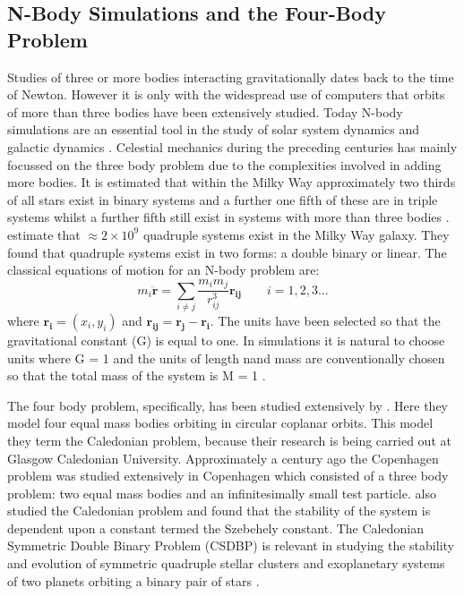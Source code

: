 \documentclass[a4paper,12pt]{article}
\begin{document}
\subsection{N-Body Simulations and the Four-Body Problem}
Studies of three or more bodies interacting gravitationally dates back to the time of Newton. However it is only with the widespread use of computers that orbits of more than three bodies have been extensively studied. Today
N-body simulations are an essential tool in the study of solar system dynamics and galactic dynamics \citep{binney}. Celestial mechanics during the preceding centuries has mainly focussed on the three body problem
due to the complexities involved in adding more bodies. It is estimated that within the Milky Way approximately two thirds of all stars exist in binary systems and a further one fifth of these are in triple systems whilst a
further fifth still exist in systems with more than three bodies \citep{steves}. \cite{steves} estimate that $\approx2\times10^9$ quadruple systems exist in the Milky Way galaxy. They found that quadruple systems exist in two
forms: a double binary or linear.
\newline
The classical equations of motion for an N-body problem are:
\begin{equation}
m_i\mathbf{\ddot{r}}=\sum_{i\neq{j}}\frac{{m_i}{m_j}}{r^3_{ij}}\mathbf{r_{ij}}
\qquad
i=1,2,3...
\end{equation}
where $\mathbf{r_i}=\left(x_i,y_i\right)$ and $\mathbf{r_{ij}}=\mathbf{r_j}-\mathbf{r_i}$. 
The units have been selected so that the gravitational constant (G) is equal to one. In simulations it is natural to choose units where G = 1 and the units of length nand mass are conventionally chosen
so that the total mass of the system is M = 1 \citep{heggie}.

The four body problem, specifically, has been studied extensively by \cite{steves}. Here they model four equal mass bodies orbiting in circular coplanar orbits. This model they term the Caledonian problem, because
their research is being carried out at Glasgow Caledonian University.
Approximately a century ago the Copenhagen problem was studied extensively in Copenhagen which consisted of a three body problem: two equal mass bodies and an infinitesimally small test particle. \cite{szell} also
studied the Caledonian problem and found that the stability of the system is dependent upon a constant termed the Szebehely constant. The Caledonian Symmetric Double Binary Problem (CSDBP) is relevant in 
studying the stability and evolution of symmetric quadruple stellar clusters and exoplanetary systems of two planets orbiting a binary pair of stars \citep{alvarez}.
\end{document}
